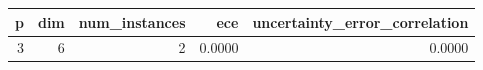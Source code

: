 \begin{tabular}{rrrrr}
\toprule
p & dim & num_instances & ece & uncertainty_error_correlation \\
\midrule
3 & 6 & 2 & 0.0000 & 0.0000 \\
\bottomrule
\end{tabular}
